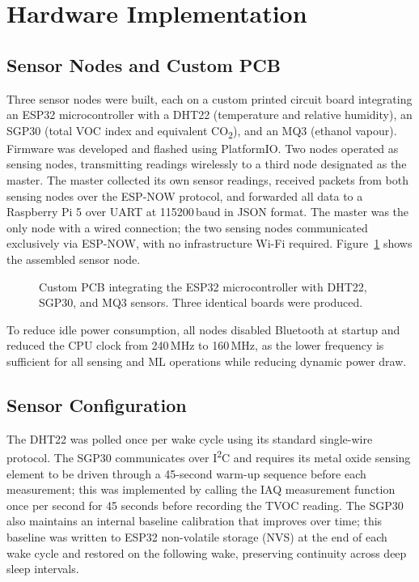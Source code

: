 \section{Hardware Implementation}

\subsection{Sensor Nodes and Custom PCB}

Three sensor nodes were built, each on a custom printed circuit board integrating an ESP32 microcontroller with a DHT22 (temperature and relative humidity), an SGP30 (total VOC index and equivalent CO\textsubscript{2}), and an MQ3 (ethanol vapour). Firmware was developed and flashed using PlatformIO. Two nodes operated as sensing nodes, transmitting readings wirelessly to a third node designated as the master. The master collected its own sensor readings, received packets from both sensing nodes over the ESP-NOW protocol, and forwarded all data to a Raspberry Pi 5 over UART at 115200\,baud in JSON format. The master was the only node with a wired connection; the two sensing nodes communicated exclusively via ESP-NOW, with no infrastructure Wi-Fi required. Figure~\ref{fig:pcb} shows the assembled sensor node.

\begin{figure}[H]
    \centering
    \caption{Custom PCB integrating the ESP32 microcontroller with DHT22, SGP30, and MQ3 sensors. Three identical boards were produced.}
    \label{fig:pcb}
\end{figure}

To reduce idle power consumption, all nodes disabled Bluetooth at startup and reduced the CPU clock from 240\,MHz to 160\,MHz, as the lower frequency is sufficient for all sensing and ML operations while reducing dynamic power draw.

\subsection{Sensor Configuration}

The DHT22 was polled once per wake cycle using its standard single-wire protocol. The SGP30 communicates over I\textsuperscript{2}C and requires its metal oxide sensing element to be driven through a 45-second warm-up sequence before each measurement; this was implemented by calling the IAQ measurement function once per second for 45 seconds before recording the TVOC reading. The SGP30 also maintains an internal baseline calibration that improves over time; this baseline was written to ESP32 non-volatile storage (NVS) at the end of each wake cycle and restored on the following wake, preserving continuity across deep sleep intervals.

